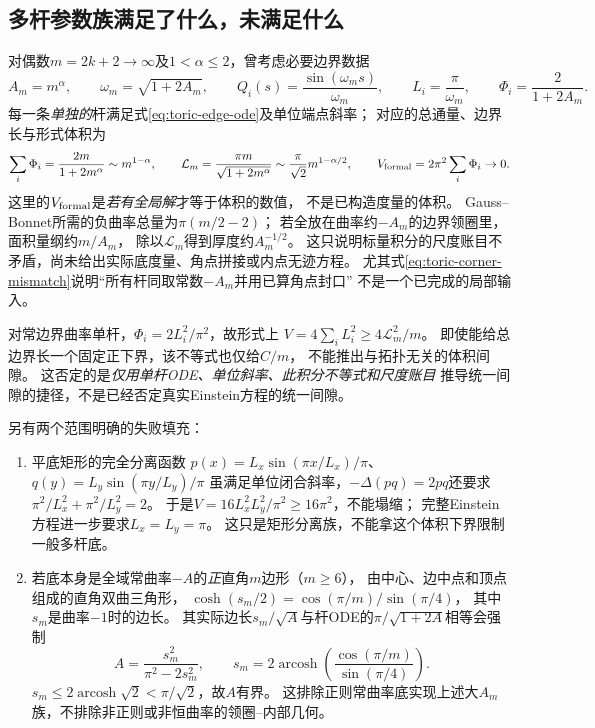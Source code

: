\documentclass[UTF8,a4paper,11pt,fontset=fandol]{ctexart}
\numberwithin{equation}{section}
\theoremstyle{definition}
\begin{document}
\subsection{多杆参数族满足了什么，未满足什么}
对偶数$m=2k+2\to\infty$及$1<\alpha\le2$，曾考虑必要边界数据
\begin{equation}\label{eq:toric-alpha-data}
 A_m=m^\alpha,\qquad \omega_m=\sqrt{1+2A_m},\qquad
 Q_i(s)=\frac{\sin(\omega_m s)}{\omega_m},\qquad
 L_i=\frac\pi{\omega_m},\qquad \Phi_i=\frac2{1+2A_m}.
\end{equation}
每一条\emph{单独的}杆满足式\eqref{eq:toric-edge-ode}及单位端点斜率；
对应的总通量、边界长与形式体积为
\begin{equation}\label{eq:toric-alpha-scales}
 \sum_i\Phi_i=\frac{2m}{1+2m^\alpha}\sim m^{1-\alpha},\qquad
 \mathcal L_m=\frac{\pi m}{\sqrt{1+2m^\alpha}}
     \sim\frac\pi{\sqrt2}m^{1-\alpha/2},\qquad
 V_{\rm formal}=2\pi^2\sum_i\Phi_i\to0.
\end{equation}
这里的$V_{\rm formal}$是\emph{若有全局解}才等于体积的数值，
不是已构造度量的体积。
Gauss--Bonnet所需的负曲率总量为$\pi(m/2-2)$；
若全放在曲率约$-A_m$的边界领圈里，面积量纲约$m/A_m$，
除以$\mathcal L_m$得到厚度约$A_m^{-1/2}$。
这只说明标量积分的尺度账目不矛盾，尚未给出实际底度量、角点拼接或内点无迹方程。
尤其式\eqref{eq:toric-corner-mismatch}说明“所有杆同取常数$-A_m$并用已算角点封口”
不是一个已完成的局部输入。

对常边界曲率单杆，$\Phi_i=2L_i^2/\pi^2$，故形式上
$V=4\sum_i L_i^2\ge4\mathcal L_m^2/m$。
即使能给总边界长一个固定正下界，该不等式也仅给$C/m$，
不能推出与拓扑无关的体积间隙。
这否定的是\emph{仅用单杆ODE、单位斜率、此积分不等式和尺度账目}
推导统一间隙的捷径，不是已经否定真实Einstein方程的统一间隙。

另有两个范围明确的失败填充：
\begin{enumerate}
\item 平底矩形的完全分离函数
$p(x)=L_x\sin(\pi x/L_x)/\pi$、$q(y)=L_y\sin(\pi y/L_y)/\pi$
虽满足单位闭合斜率，$-\Delta(pq)=2pq$还要求
$\pi^2/L_x^2+\pi^2/L_y^2=2$。
于是$V=16L_x^2L_y^2/\pi^2\ge16\pi^2$，不能塌缩；
完整Einstein方程进一步要求$L_x=L_y=\pi$。
这只是矩形分离族，不能拿这个体积下界限制一般多杆底。
\item 若底本身是全域常曲率$-A$的\emph{正}直角$m$边形（$m\ge6$），
由中心、边中点和顶点组成的直角双曲三角形，
$\cosh(s_m/2)=\cos(\pi/m)/\sin(\pi/4)$，
其中$s_m$是曲率$-1$时的边长。
其实际边长$s_m/\sqrt A$与杆ODE的$\pi/\sqrt{1+2A}$相等会强制
\begin{equation}\label{eq:toric-regular-polygon}
 A=\frac{s_m^2}{\pi^2-2s_m^2},\qquad
 s_m=2\operatorname{arcosh}\!\left(\frac{\cos(\pi/m)}{\sin(\pi/4)}\right).
\end{equation}
$s_m\le2\operatorname{arcosh}\sqrt2<\pi/\sqrt2$，故$A$有界。
这排除正则常曲率底实现上述大$A_m$族，不排除非正则或非恒曲率的领圈--内部几何。
\end{enumerate}
\end{document}
